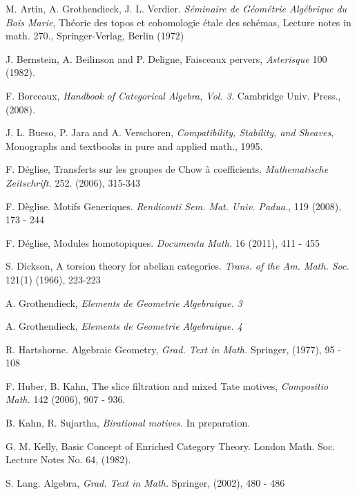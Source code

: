 \newpage

\begin{thebibliography}{10}

M. Artin, A. Grothendieck, J. L. Verdier.
{\em S\'eminaire de G\'eom\'etrie Alg\'ebrique du Bois Marie},
Th\'eorie des topos et cohomologie \'etale des sch\'emas, 
Lecture notes in math. 270., Springer-Verlag, Berlin (1972)

J. Bernstein, A. Beilinson and P. Deligne,
Faisceaux pervers, {\em Asterisque} 100 (1982).

F. Borceaux,
{\em Handbook of Categorical Algebra, Vol. 3.}
Cambridge Univ. Press., (2008).

J. L. Bueso, P. Jara and A. Verschoren,
{\em Compatibility, Stability, and Sheaves}, 
Monographs and textbooks in pure and applied math.,
1995.

F. D\'eglise,
Transferts sur les groupes de Chow \`a coefficients.
{\em Mathematische Zeitschrift.} 252. (2006), 315-343

F. D\`eglise.
Motifs Generiques.
\emph{Rendiconti Sem. Mat. Univ. Padua.}, 119 (2008), 173 - 244

F. D\'eglise, 
Modules homotopiques.
{\em Documenta Math.}
16 (2011), 411 - 455

S. Dickson,
A torsion theory for abelian categories.
{\em Trans. of the Am. Math. Soc.} 121(1) (1966), 223-223

A. Grothendieck,
{\em Elements de Geometrie Algebraique. 3}

A. Grothendieck,
{\em Elements de Geometrie Algebraique. 4}

R. Hartshorne.
Algebraic Geometry, {\em Grad. Text in Math.}
Springer, (1977), 95 - 108

F. Huber, B. Kahn, The slice filtration and mixed Tate motives,
{\em Compositio Math.} 142 (2006), 907 - 936.

B. Kahn, R. Sujartha,
\emph{Birational motives.}
In preparation.

G. M. Kelly, Basic Concept of Enriched Category Theory.
London Math. Soc. Lecture Notes No. 64, (1982).

S. Lang.
Algebra, {\em Grad. Text in Math.}
Springer, (2002), 480 - 486


\end{thebibliography}
